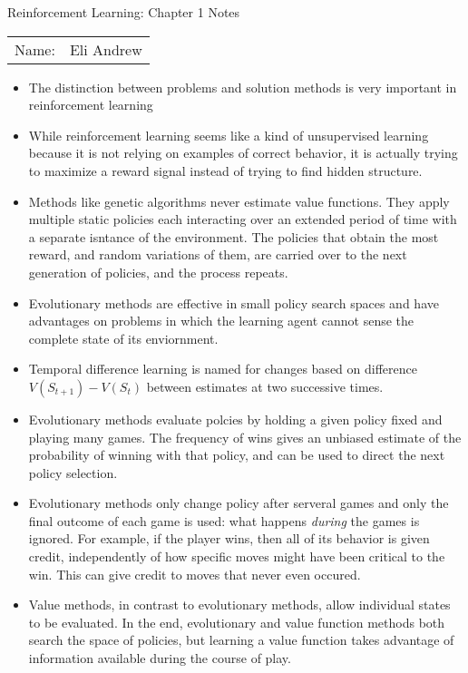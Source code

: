 \documentclass[12pt]{article}
\begin{document}
\begin{center}
{\Large Reinforcement Learning: Chapter 1 Notes}

\begin{tabular}{rl}
Name: & Eli Andrew
\end{tabular}
\end{center}

  \begin{itemize}
    \item The distinction between problems and solution methods is very
    important in reinforcement learning
    \item While reinforcement learning seems like a kind of unsupervised learning
    because it is not relying on examples of correct behavior, it is actually trying
    to maximize a reward signal instead of trying to find hidden structure.
    \item Methods like genetic algorithms never estimate value functions. They apply
    multiple static policies each interacting over an extended period of time with a
    separate isntance of the environment. The policies that obtain the most reward,
    and random variations of them, are carried over to the next generation of policies,
    and the process repeats.
    \item Evolutionary methods are effective in small policy search spaces and have advantages
    on problems in which the learning agent cannot sense the complete state of its enviornment.
    \item Temporal difference learning is named for changes based on difference $V(S_{t+1}) - V(S_t)$
    between estimates at two successive times.
    \item Evolutionary methods evaluate polcies by holding a given policy fixed and playing many games.
    The frequency of wins gives an unbiased estimate of the probability of winning with that policy, and
    can be used to direct the next policy selection.
    \item Evolutionary methods only change policy after serveral games and only the final outcome of each
    game is used: what happens \textit{during} the games is ignored. For example, if the player wins,
    then all of its behavior is given credit, independently of how specific moves might have been critical
    to the win. This can give credit to moves that never even occured.
    \item Value methods, in contrast to evolutionary methods, allow individual states to be evaluated. In the
    end, evolutionary and value function methods both search the space of policies, but learning a value function
    takes advantage of information available during the course of play.
  \end{itemize}
\end{document}
